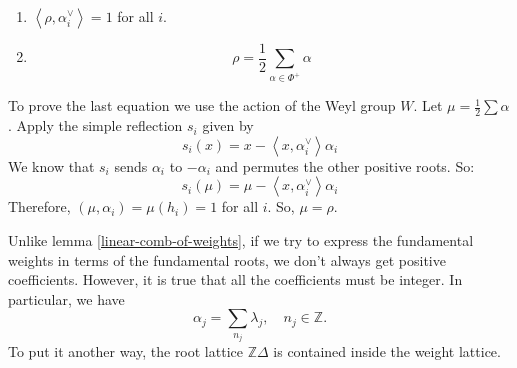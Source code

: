 \begin{enumerate}
    \item $\left\langle\rho,\alpha_i^\vee\right\rangle = 1$ for all $i$.
    \item
          \[
              \rho = \frac{1}{2} \sum_{\alpha \in \Phi^+} \alpha
          \]
\end{enumerate}

To prove the last equation we use the action of the Weyl group $W$. Let $\mu = \frac{1}{2} \sum \alpha$. Apply the simple reflection $s_i$ given by
\[
    s_i(x) = x - \left\langle x, \alpha_i^\vee\right\rangle \alpha_i
\]
We know that $s_i$ sends $\alpha_i$ to $-\alpha_i$ and permutes the other positive roots. So:
\[
    s_i(\mu) = \mu -  \left\langle x, \alpha_i^\vee\right\rangle  \alpha_i
\]
Therefore, $(\mu, \alpha_i) = \mu(h_i) = 1$ for all $i$. So, $\mu = \rho$.

Unlike lemma \ref{linear-comb-of-weights}, if we try to express the fundamental weights in terms of the fundamental roots, we don't always
get positive coefficients. However, it is true that all the coefficients must be integer. In particular, we have
\[\alpha_j = \sum_{n_j}\lambda_j, \quad n_j \in \mathbb{Z}.\]
To put it another way, the root lattice $\mathbb{Z}\Delta$ is contained inside the weight lattice.
